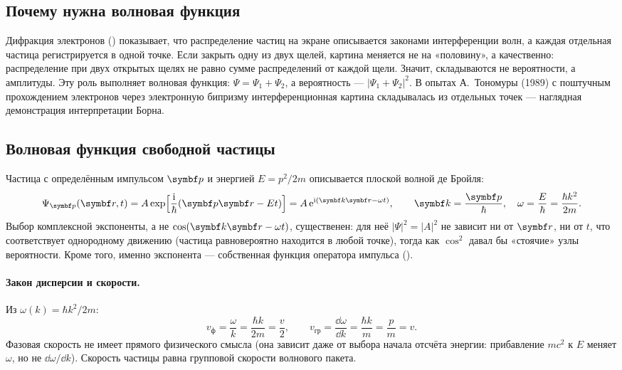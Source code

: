 \subsection{Почему нужна волновая функция}

Дифракция электронов () показывает, что распределение частиц на экране описывается
законами интерференции волн, а каждая отдельная частица регистрируется в одной точке. Если
закрыть одну из двух щелей, картина меняется не на «половину», а качественно: распределение
при двух открытых щелях не равно сумме распределений от каждой щели. Значит, складываются не
вероятности, а амплитуды. Эту роль выполняет волновая функция: $\Psi=\Psi_1+\Psi_2$, а
вероятность — $|\Psi_1+\Psi_2|^2$. В опытах А.~Тономуры (1989) с поштучным прохождением
электронов через электронную бипризму интерференционная картина складывалась из отдельных
точек — наглядная демонстрация интерпретации Борна.

\subsection{Волновая функция свободной частицы}

Частица с определённым импульсом $\vect p$ и энергией $E=p^2/2m$ описывается плоской волной
де Бройля:
\begin{equation}\label{eq:4:plane}
  \Psi_{\vect p}(\vect r,t)=A\exp\Bigl[\frac{\ii}{\hbar}(\vect p\vect r-Et)\Bigr]
  =A\,\ee^{\ii(\vect k\vect r-\omega t)},\qquad
  \vect k=\frac{\vect p}{\hbar},\quad \omega=\frac{E}{\hbar}=\frac{\hbar k^2}{2m}.
\end{equation}
Выбор комплексной экспоненты, а не $\cos(\vect k\vect r-\omega t)$, существенен: для неё
$|\Psi|^2=|A|^2$ не зависит ни от $\vect r$, ни от $t$, что соответствует однородному
движению (частица равновероятно находится в любой точке), тогда как $\cos^2$ давал бы
«стоячие» узлы вероятности. Кроме того, именно экспонента — собственная функция оператора
импульса ().

\paragraph{Закон дисперсии и скорости.} Из $\omega(k)=\hbar k^2/2m$:
\begin{equation}\label{eq:4:vel}
  v_{\text{ф}}=\frac{\omega}{k}=\frac{\hbar k}{2m}=\frac{v}{2},\qquad
  v_{\text{гр}}=\frac{\dd\omega}{\dd k}=\frac{\hbar k}{m}=\frac{p}{m}=v .
\end{equation}
Фазовая скорость не имеет прямого физического смысла (она зависит даже от выбора начала
отсчёта энергии: прибавление $mc^2$ к $E$ меняет $\omega$, но не $\dd\omega/\dd k$). Скорость
частицы равна групповой скорости волнового пакета.

